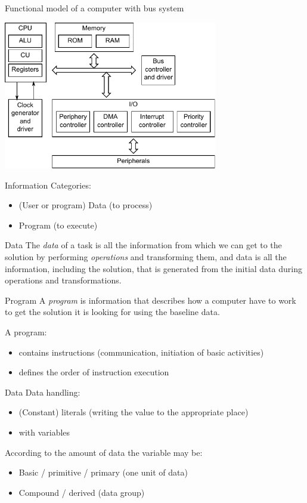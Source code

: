 \documentclass[usenames,dvipsnames,aspectratio=169]{beamer}
\begin{document}
\begin{frame}{Functional model of a computer with bus system}
  \begin{center}
    \includegraphics[width=0.7\textwidth,keepaspectratio=true]{./funcModel.pdf}
  \end{center}
\end{frame}

\begin{frame}{Information}
  Categories:
  \begin{itemize}
    \item (User or program) Data (to process)
    \item Program (to execute)
  \end{itemize}
  \begin{block}{Data}
    \small
    The \emph{data} of a task is all the information from which we can get to the solution
    by performing \emph{operations} and transforming them, and
    data is all the information, including the solution, that is generated from the initial data 
    during operations and transformations.
  \end{block}
  \begin{block}{Program}
    \small
    A \emph{program} is information that describes how a computer have to work to get the solution 
    it is looking for using the baseline data.
  \end{block}
  A program:
  \begin{itemize}
    \item contains instructions (communication, initiation of basic activities)
    \item defines the order of instruction execution
  \end{itemize}
\end{frame}

\begin{frame}{Data}
  Data handling:
  \begin{itemize}
    \item (Constant) literals (writing the value to the appropriate place)
    \item with variables
  \end{itemize}
  \vfill
  According to the amount of data the variable may be:
  \begin{itemize}
    \item Basic / primitive / primary (one unit of data)
    \item Compound / derived (data group)
  \end{itemize}
\end{frame}
\end{document}
